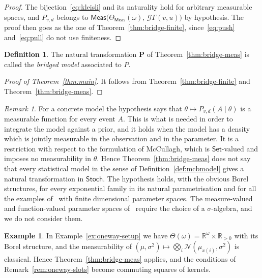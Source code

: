 \documentclass[11pt,a4paper]{article}
\theoremstyle{plain}
\theoremstyle{definition}
\newtheorem{definition}[theorem]{Definition}
\newtheorem{example}[theorem]{Example}
\theoremstyle{remark}
\newtheorem{remark}[theorem]{Remark}
\newcommand{\cat}[1]{\mathsf{#1}}
\newcommand{\Meas}{\cat{Meas}}
\newcommand{\Set}{\cat{Set}}
\newcommand{\Stoch}{\cat{Stoch}}
\newcommand{\G}{\mathcal{G}}
\newcommand{\R}{\mathbb{R}}
\newcommand{\Norm}{\mathcal{N}}
\begin{document}
\begin{proof}
The bijection~\eqref{eq:kleisli} and its naturality hold for arbitrary
measurable spaces, and $P_{v,d}$ belongs to
$\Meas\bigl(\Theta_\Meas(\omega),\,\G\Gamma(v,u)\bigr)$ by hypothesis. The
proof then goes as the one of Theorem~\ref{thm:bridge-finite},
since~\eqref{eq:push} and~\eqref{eq:pull} do not use finiteness.
\end{proof}

\begin{definition}\label{def:bridged}
The natural transformation $\mathbf{P}$ of Theorem~\ref{thm:bridge-meas} is
called the \emph{bridged model} associated to $P$.
\end{definition}

\begin{proof}[Proof of Theorem~\ref{thm:main}]
It follows from Theorem~\ref{thm:bridge-finite} and
Theorem~\ref{thm:bridge-meas}.
\end{proof}

\begin{remark}\label{rem:meas-hyp}
For a concrete model the hypothesis says that
$\theta \mapsto P_{v,d}(A \mid \theta)$ is a measurable function for every event
$A$. This is what is needed in order to integrate the model against a prior,
and it holds when the model has a density which is jointly measurable in the
observation and in the parameter. It is a restriction with respect to the
formulation of McCullagh, which is $\Set$-valued and imposes no measurability
in $\theta$.
Hence Theorem~\ref{thm:bridge-meas} does not say that every statistical model
in the sense of Definition~\ref{def:mcbmodel} gives a natural transformation
in $\Stoch$. The hypothesis holds, with the obvious Borel structures, for
every exponential family in its natural parametrisation and for all the
examples of~\cite{mccullagh_what_2002} with finite dimensional parameter
spaces. The measure-valued and function-valued parameter spaces
of~\cite[\S8]{mccullagh_what_2002} require the choice of a $\sigma$-algebra,
and we do not consider them.
\end{remark}

\begin{example}\label{ex:oneway-cont}
In Example~\ref{ex:oneway-setup} we have $\Theta(\omega)=\R^\omega\times\R_{>0}$
with its Borel structure, and the measurability of
$(\mu,\sigma^2) \mapsto \bigotimes_i \Norm(\mu_{x(i)},\sigma^2)$ is classical.
Hence Theorem~\ref{thm:bridge-meas} applies, and the conditions of
Remark~\ref{rem:oneway-slots} become commuting squares of kernels.
\end{example}
\end{document}
